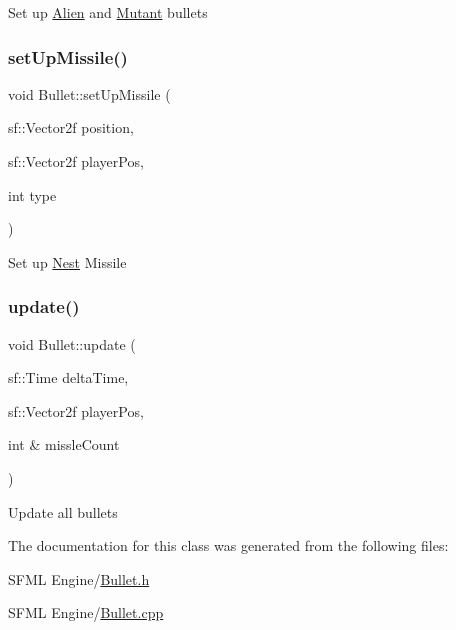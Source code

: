 Set up \hyperlink{class_alien}{Alien} and \hyperlink{class_mutant}{Mutant} bullets \mbox{\label{class_bullet_a5ee57e44e79f829920f4c117937d5f97}} 
\subsubsection{\texorpdfstring{set\+Up\+Missile()}{setUpMissile()}}
{\footnotesize\ttfamily void Bullet\+::set\+Up\+Missile (\begin{DoxyParamCaption}\item[{sf\+::\+Vector2f}]{position,  }\item[{sf\+::\+Vector2f}]{player\+Pos,  }\item[{int}]{type }\end{DoxyParamCaption})}

Set up \hyperlink{class_nest}{Nest} Missile \mbox{\label{class_bullet_ac1793d563983d2503cc562e0b3e1eee7}} 
\subsubsection{\texorpdfstring{update()}{update()}}
{\footnotesize\ttfamily void Bullet\+::update (\begin{DoxyParamCaption}\item[{sf\+::\+Time}]{delta\+Time,  }\item[{sf\+::\+Vector2f}]{player\+Pos,  }\item[{int \&}]{missle\+Count }\end{DoxyParamCaption})}

Update all bullets 

The documentation for this class was generated from the following files\+:\begin{DoxyCompactItemize}
\item 
S\+F\+M\+L Engine/\hyperlink{_bullet_8h}{Bullet.\+h}\item 
S\+F\+M\+L Engine/\hyperlink{_bullet_8cpp}{Bullet.\+cpp}\end{DoxyCompactItemize}
